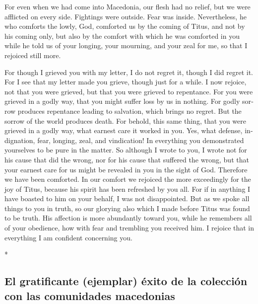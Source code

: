 \begin{paracol}{2}
\begin{otherlanguage}{english}
 For even when we had come into Macedonia, our flesh had
no relief, but we were afflicted on every side. Fightings were outside.
Fear was inside.  Nevertheless, he who comforts the lowly,
God, comforted us by the coming of Titus,  and not by his
coming only, but also by the comfort with which he was comforted in you
while he told us of your longing, your mourning, and your zeal for me,
so that I rejoiced still more.

 For though I grieved you with my letter, I do not regret
it, though I did regret it. For I see that my letter made you grieve,
though just for a while.  I now rejoice, not that you were
grieved, but that you were grieved to repentance. For you were grieved
in a godly way, that you might suffer loss by us in nothing.
 For godly sorrow produces repentance leading to
salvation, which brings no regret. But the sorrow of the world produces
death.  For behold, this same thing, that you were
grieved in a godly way, what earnest care it worked in you. Yes, what
defense, indignation, fear, longing, zeal, and vindication! In
everything you demonstrated yourselves to be pure in the matter.
 So although I wrote to you, I wrote not for his cause
that did the wrong, nor for his cause that suffered the wrong, but that
your earnest care for us might be revealed in you in the sight of God.
 Therefore we have been comforted. In our comfort we
rejoiced the more exceedingly for the joy of Titus, because his spirit
has been refreshed by you all.  For if in anything I have
boasted to him on your behalf, I was not disappointed. But as we spoke
all things to you in truth, so our glorying also which I made before
Titus was found to be truth.  His affection is more
abundantly toward you, while he remembers all of your obedience, how
with fear and trembling you received him.  I rejoice that
in everything I am confident concerning you.

\end{otherlanguage}

\switchcolumn[0]*

\hypertarget{el-gratificante-ejemplar-uxe9xito-de-la-colecciuxf3n-con-las-comunidades-macedonias}{%
\subsection{El gratificante (ejemplar) éxito de la colección con las
comunidades
macedonias}\label{el-gratificante-ejemplar-uxe9xito-de-la-colecciuxf3n-con-las-comunidades-macedonias}}


\end{paracol}
